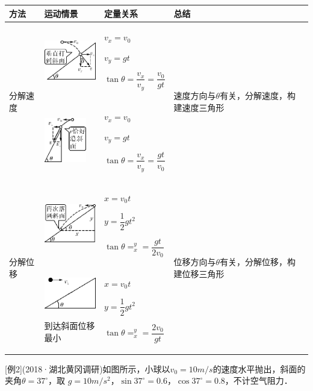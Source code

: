 \documentclass[cn,10.5pt,chinese,mac,chinesefont=founder]{elegantbook}
\begin{document}
\begin{longtable}[]{@{}m{2cm}m{3cm}m{3cm}m{5cm}@{}}
\toprule
方法 & 运动情景 & 定量关系 & 总结\tabularnewline
\midrule
\endhead
\multirow{2}{2cm}{分解速度}
&
\includegraphics[width=0.91667in,height=0.69792in]{media/image163.png}
&
$v_x=v_0$

$v_y=gt$

$\tan \theta=\dfrac{v_{x}}{v_{y}}=\dfrac{v_{0}}{g t}$
&
\multirow{2}{5cm}{速度方向与$\theta$有关，分解速度，构建速度三角形}

\tabularnewline
& 
\includegraphics[width=0.71875in,height=0.76042in]{media/image164.png}
&
$v_x=v_0$

$v_y=gt$

$\tan \theta=\dfrac{v_{x}}{v_{y}}=\dfrac{g t}{v_{0}}$

& \tabularnewline
\multirow{2}{2cm}{分解位移}
& 
\includegraphics[width=0.9375in,height=0.6875in]{media/image165.png}
&
$x=v_0t$

$y=\dfrac{1}{2} gt^2$

$\tan \theta=_{x}^{y}=\dfrac{g t}{2 v_{0}}$
& 
\multirow{2}{5cm}{位移方向与$\theta$有关，分解位移，构建位移三角形}
\tabularnewline
&
\includegraphics[width=0.90625in,height=0.54167in]{media/image166.png}

到达斜面位移最小
&
$x=v_0t$

$y=\dfrac{1}{2} gt^2$

$\tan \theta=_{x}^{y}=\dfrac{2 v_{0}}{g t}$
 & \tabularnewline
\bottomrule
\end{longtable}

{[}例2{]}(2018·湖北黄冈调研)如图所示，小球以$v_0=10m/s$的速度水平抛出，斜面的夹角$\theta=37^\circ$，取 $g=10m/s^2$，$\sin 37^\circ=0.6$，$\cos37^\circ=0.8$，不计空气阻力．
\end{document}

